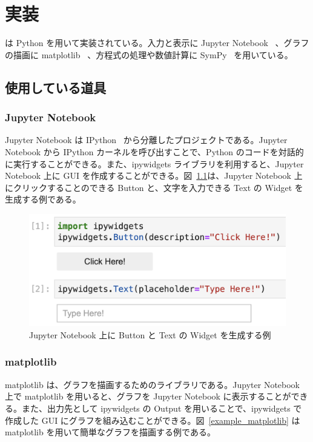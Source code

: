 \chapter{実装} \label{implementation}

\simname は Python を用いて実装されている。入力と表示に Jupyter Notebook~\cite{kluyver_jupyter_nodate} 、グラフの描画に matplotlib~\cite{hunter_matplotlib_2007} 、方程式の処理や数値計算に SymPy~\cite{meurer_sympy_2017} を用いている。

\section{使用している道具}

\subsection{Jupyter Notebook}
Jupyter Notebook は IPython~\cite{perez_ipython_2007} から分離したプロジェクトである。Jupyter Notebook から IPython カーネルを呼び出すことで、Python のコードを対話的に実行することができる。また、ipywidgets ライブラリを利用すると、Jupyter Notebook 上に GUI を作成することができる。図~\ref{example_jupyter}は、Jupyter Notebook 上にクリックすることのできる Button と、文字を入力できる Text の Widget を生成する例である。

\begin{figure}[htb]
\centering
\includegraphics[width=0.9\linewidth]{work/example_jupyter.png}
\caption{Jupyter Notebook 上に Button と Text の
Widget を生成する例} \label{example_jupyter}
\end{figure}

\subsection{matplotlib}
matplotlib は、グラフを描画するためのライブラリである。Jupyter Notebook 上で matplotlib を用いると、グラフを Jupyter Notebook に表示することができる。また、出力先として ipywidgets の Output を用いることで、ipywidgets で作成した GUI にグラフを組み込むことができる。図~\ref{example_matplotlib} は matplotlib を用いて簡単なグラフを描画する例である。

